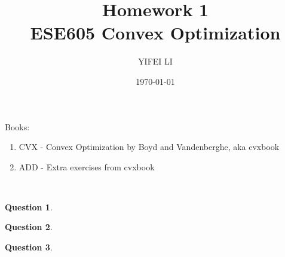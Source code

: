 \documentclass[12pt]{amsart}
\title{Homework 1 \\ ESE605 Convex Optimization}
\author{YIFEI LI}
\date{\today}
\theoremstyle{definition}
\newtheorem{question}{Question}
\theoremstyle{remark}
\theoremstyle{definition}
\begin{document}
\maketitle

Books: 
\begin{enumerate}
    \item CVX - Convex Optimization by Boyd and Vandenberghe, aka cvxbook
    \item ADD - Extra exercises from cvxbook
\end{enumerate}
\ \

\begin{question}

\end{question}

\begin{question}
  
\end{question}

\begin{question}
  
\end{question}
\end{document}
